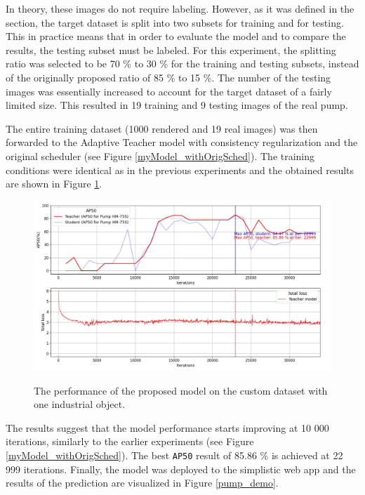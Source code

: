In theory, these images do not require labeling. However, as it was defined in the  section, the target dataset is split into two subsets for training and for testing. This in practice means that in order to evaluate the model and to compare the results, the testing subset must be labeled. For this experiment, the splitting ratio was selected to be 70 \% to 30 \% for the training and testing subsets, instead of the originally proposed ratio of 85 \% to 15 \%. The number of the testing images was essentially increased to account for the target dataset of a fairly limited size. This resulted in 19 training and 9 testing images of the real pump. 

The entire training dataset (1000 rendered and 19 real images) was then forwarded to the Adaptive Teacher model with consistency regularization and the original scheduler (see Figure \ref{myModel_withOrigSched}). The training conditions were identical as in the previous experiments and the obtained results are shown in Figure \ref{pump_results}. 

\begin{figure}[htb]
	\begin{center}
		\includegraphics[width=14cm]{./loss&AP50_pump.jpg}
	\end{center}
	\caption{The performance of the proposed model on the custom dataset with one industrial object.}
	\begin{center}\label{pump_results}
	\end{center}
\end{figure}
\FloatBarrier

The results suggest that the model performance starts improving at 10 000 iterations, similarly to the earlier experiments (see Figure \ref{myModel_withOrigSched}). The best \texttt{AP50} result of 85.86 \% is achieved at 22 999 iterations. Finally, the model was deployed to the simplistic web app and the results of the prediction are visualized in Figure \ref{pump_demo}.


